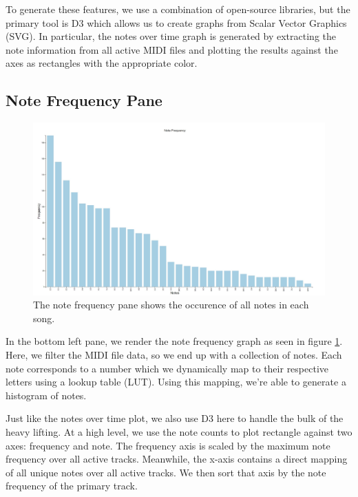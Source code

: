 \documentclass[journal]{vgtc}                %
\begin{document}
To generate these features, we use a combination of open-source libraries, but
the primary tool is D3 which allows us to create graphs from Scalar Vector
Graphics (SVG). In particular, the notes over time graph is generated by
extracting the note information from all active MIDI files and plotting the
results against the axes as rectangles with the appropriate color.

\subsection{Note Frequency Pane}

\begin{figure}[h]
  \centering
  \includegraphics[width=\columnwidth]{note-frequency-single-track}
  \caption{The note frequency pane shows the occurence of all notes in each song.}
  \label{fig:note-frequency}
\end{figure}

In the bottom left pane, we render the note frequency graph as seen in figure
\ref{fig:note-frequency}. Here, we filter the MIDI file data, so we end up with
a collection of notes. Each note corresponds to a number which we dynamically
map to their respective letters using a lookup table (LUT). Using this mapping,
we're able to generate a histogram of notes.

Just like the notes over time plot, we also use D3 here to handle the bulk of
the heavy lifting. At a high level, we use the note counts to plot rectangle
against two axes: frequency and note. The frequency axis is scaled by the
maximum note frequency over all active tracks. Meanwhile, the x-axis
contains a direct mapping of all unique notes over all active tracks. We then
sort that axis by the note frequency of the primary track.
\end{document}
